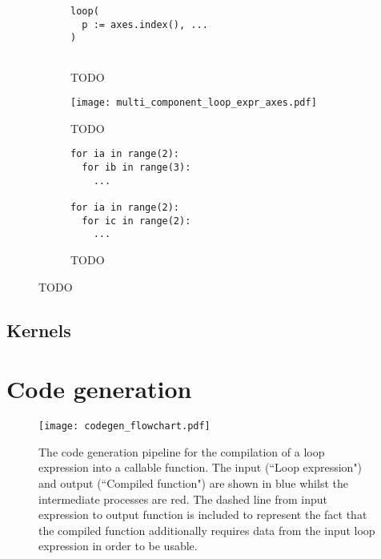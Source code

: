 \documentclass[thesis]{subfiles}
\begin{document}
\begin{figure}[h]
  \centering

  \begin{subfigure}[t]{.32\textwidth}
    \centering
    \begin{verbatim}
loop(
  p := axes.index(), ...
)


    \end{verbatim}
    \caption{TODO}
    \label{fig:multi_component_loop_expr_init}
  \end{subfigure}
  \begin{subfigure}[t]{.32\textwidth}
    \centering
    \texttt{[image: multi\_component\_loop\_expr\_axes.pdf]}
    \caption{TODO}
    \label{fig:multi_component_loop_expr_axes}
  \end{subfigure}
  \begin{subfigure}[t]{.32\textwidth}
    \centering
    \begin{verbatim}
for ia in range(2):
  for ib in range(3):
    ...

for ia in range(2):
  for ic in range(2):
    ...
    \end{verbatim}
    \caption{TODO}
    \label{fig:multi_component_loop_expr_codegen}
  \end{subfigure}

  \caption{TODO}
  \label{fig:multi_component_loop_expr}
\end{figure}

\subsection{Kernels}


\section{Code generation}

\begin{figure}[h]
  \centering
  \texttt{[image: codegen\_flowchart.pdf]}
  \caption{
    The code generation pipeline for the compilation of a loop expression into a callable function.
    The input (``Loop expression") and output (``Compiled function") are shown in blue whilst the intermediate processes are red.
    The dashed line from input expression to output function is included to represent the fact that the compiled function additionally requires data from the input loop expression in order to be usable.
  }
  \label{fig:codegen_flowchart}
\end{figure}
\end{document}
